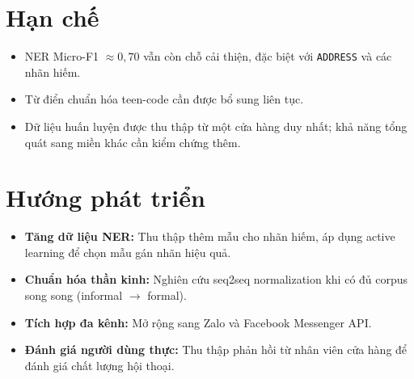 \documentclass[12pt, a4paper]{report}
\begin{document}
\section*{Hạn chế}

\begin{itemize}
  \item NER Micro-F1 $\approx 0,70$ vẫn còn chỗ cải thiện,
        đặc biệt với \texttt{ADDRESS} và các nhãn hiếm.
  \item Từ điển chuẩn hóa teen-code cần được bổ sung liên tục.
  \item Dữ liệu huấn luyện được thu thập từ một cửa hàng duy nhất;
        khả năng tổng quát sang miền khác cần kiểm chứng thêm.
\end{itemize}

\section*{Hướng phát triển}

\begin{itemize}
  \item \textbf{Tăng dữ liệu NER:} Thu thập thêm mẫu cho nhãn hiếm,
        áp dụng active learning để chọn mẫu gán nhãn hiệu quả.
  \item \textbf{Chuẩn hóa thần kinh:} Nghiên cứu seq2seq normalization
        khi có đủ corpus song song (informal $\rightarrow$ formal).
  \item \textbf{Tích hợp đa kênh:} Mở rộng sang Zalo và Facebook Messenger API.
  \item \textbf{Đánh giá người dùng thực:} Thu thập phản hồi
        từ nhân viên cửa hàng để đánh giá chất lượng hội thoại.
\end{itemize}
\end{document}
